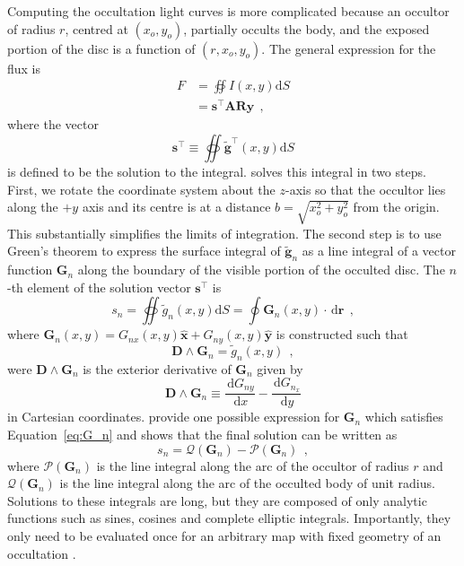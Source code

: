 \documentclass[12pt,dvipsnames]{report}
\newcommand{\ud}{\,\mathrm{d}}
\newcommand{\hquad}{~~}
\begin{document}
Computing the occultation light curves is more complicated because 
an occultor of radius $r$, centred at $(x_o, y_o)$, partially occults
the body, and the exposed portion of the disc is a function of $(r, x_o, y_o)$. The
general expression for the flux is
\begin{align}
    F & =\oiint I(x, y) \mathrm{d} S                              \\
      & =\mathbf{s}^\intercal  \mathbf{A} \mathbf{R} \mathbf{y} 
      \hquad,
\end{align}
where the vector
\begin{equation}
    \mathbf{s}^\intercal \equiv \oiint \tilde{\mathbf{g}}^{\intercal}(x, y) \mathrm{d} S
\end{equation}
is defined to be the solution to the integral.
\citet{2019AJ....157...64L} solves this integral in two steps.  First, we rotate
the coordinate system about the  $z$-axis  so that the occultor lies along the
$+y$ axis and its centre is at
a distance $b=\sqrt{x_o^{2}+y_o^{2}}$ from the origin. This substantially simplifies
the limits of integration.
The second step is to use Green's theorem to express the surface integral of
$\tilde{\mathbf{g}}_n$ as a line integral of a vector function $\mathbf{G}_n$
along the boundary of the visible portion of the occulted disc.
The $n$-th element of the solution vector $\mathbf{s}^\intercal$ is
\begin{equation}
    s_{n}=\oiint \tilde{g}_{n}(x, y) \mathrm{d} S=\oint \mathbf{G}_{n}(x, y) \cdot \ud \mathbf{r}
    \hquad,
\end{equation}
where
$\mathbf{G}_{n}(x, y)=G_{n x}(x, y) \hat{\mathbf{x}}+G_{n y}(x, y) \hat{\mathbf{y}}$
is constructed such that
\begin{equation}
    \mathbf{D} \wedge \mathbf{G}_{n}=\tilde{g}_{n}(x, y)
    \hquad,
    \label{eq:G_n}
\end{equation}
were $\mathbf{D} \wedge \mathbf{G}_{n}$ is the exterior derivative of $\mathbf{G}_n$
given by
\begin{equation}
    \mathbf{D} \wedge \mathbf{G}_{n} \equiv \frac{\ud G_{n y}}{\ud x}-\frac{\ud G_{n_{x}}}{\ud y}
\end{equation}
in Cartesian coordinates.
\citet{2019AJ....157...64L} provide one possible expression for $\mathbf{G}_n$
which satisfies Equation~\ref{eq:G_n} and shows that the final solution can be written as
\begin{equation}
    s_{n}=\mathcal{Q}\left(\mathbf{G}_{n}\right)-\mathcal{P}\left(\mathbf{G}_{n}\right)
    \hquad,
\end{equation}
where $\mathcal{P}(\mathbf{G}_n)$ is the  line integral along the arc of the occultor
of radius $r$ and $\mathcal{Q}(\mathbf{G}_n)$ is the line integral along the arc of the
occulted body of unit radius. Solutions to these integrals are long, but they are composed of 
only analytic functions such as sines, cosines and complete elliptic integrals. Importantly,
they only need to be evaluated once for an arbitrary map with fixed geometry of an
occultation \citep{2019AJ....157...64L}.
\end{document}
